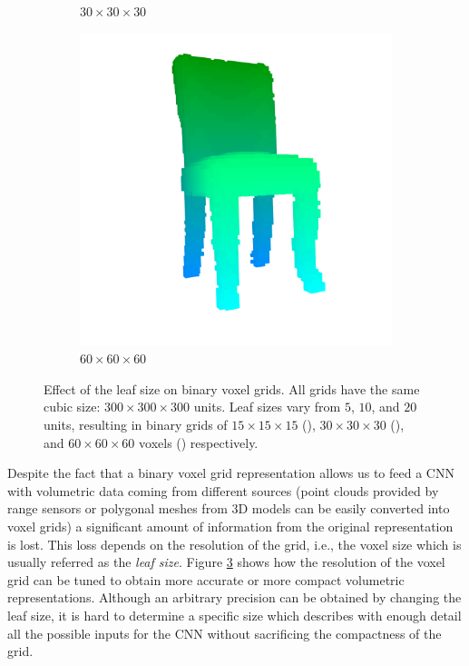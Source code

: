 \begin{figure}[!t]
\begin{subfigure}{0.32\linewidth}
		\caption{$30\times30\times30$}
		\label{subfig:objrecog:binary_voxel_grids:30}
	\end{subfigure}
	\hfill
	\begin{subfigure}{0.32\linewidth}
		\includegraphics[width=\linewidth]{Figures/ObjRecog/chair_voxel_60}
		\caption{$60\times60\times60$}
		\label{subfig:objrecog:binary_voxel_grids:60}
	\end{subfigure}
	\caption{Effect of the leaf size on binary voxel grids. All grids have the same cubic size: $300\times300\times300$ units. Leaf sizes vary from $5$, $10$, and $20$ units, resulting in binary grids of $15\times15\times15$ (), $30\times30\times30$ (), and $60\times60\times60$ voxels () respectively.}
	\label{fig:objrecog:binary_voxel_grids}
\end{figure}

Despite the fact that a binary voxel grid representation allows us to feed a \ac{CNN} with volumetric data coming from different sources (point clouds provided by range sensors or polygonal meshes from \acs{3D} models can be easily converted into voxel grids) a significant amount of information from the original representation is lost. This loss depends on the resolution of the grid, i.e., the voxel size which is usually referred as the \emph{leaf size}. Figure \ref{fig:objrecog:binary_voxel_grids} shows how the resolution of the voxel grid can be tuned to obtain more accurate or more compact volumetric representations. Although an arbitrary precision can be obtained by changing the leaf size, it is hard to determine a specific size which describes with enough detail all the possible inputs for the \ac{CNN} without sacrificing the compactness of the grid. 

